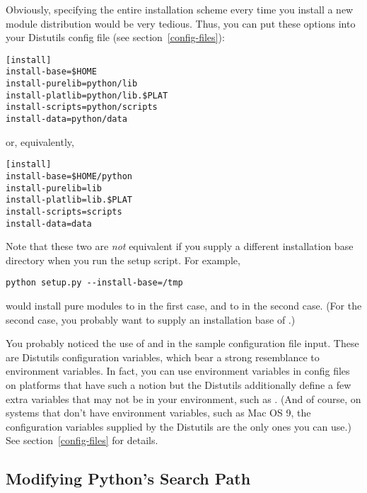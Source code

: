 \documentclass{howto}
\begin{document}
Obviously, specifying the entire installation scheme every time you
install a new module distribution would be very tedious.  Thus, you can
put these options into your Distutils config file (see
section~\ref{config-files}):

\begin{verbatim}
[install]
install-base=$HOME
install-purelib=python/lib
install-platlib=python/lib.$PLAT
install-scripts=python/scripts
install-data=python/data
\end{verbatim}

or, equivalently,

\begin{verbatim}
[install]
install-base=$HOME/python
install-purelib=lib
install-platlib=lib.$PLAT
install-scripts=scripts
install-data=data
\end{verbatim}

Note that these two are \emph{not} equivalent if you supply a different
installation base directory when you run the setup script.  For example,

\begin{verbatim}
python setup.py --install-base=/tmp
\end{verbatim}

would install pure modules to  in the first
case, and to  in the second case.  (For the second
case, you probably want to supply an installation base of
.)

You probably noticed the use of  and  in the
sample configuration file input.  These are Distutils configuration
variables, which bear a strong resemblance to environment variables.
In fact, you can use environment variables in config files on
platforms that have such a notion but the Distutils additionally
define a few extra variables that may not be in your environment, such
as .  (And of course, on systems that don't have
environment variables, such as Mac OS 9, the configuration
variables supplied by the Distutils are the only ones you can use.)
See section~\ref{config-files} for details.



\subsection{Modifying Python's Search Path}
\label{search-path}
\end{document}
